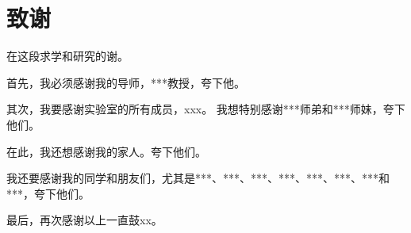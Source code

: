 
\makechaptertitlecenter\chapter{致\hspace{1em}谢}
在这段求学和研究的谢。
	
首先，我必须感谢我的导师，***教授，夸下他。

其次，我要感谢实验室的所有成员，xxx。
我想特别感谢***师弟和***师妹，夸下他们。

在此，我还想感谢我的家人。夸下他们。

我还要感谢我的同学和朋友们，尤其是***、***、***、***、***、***、***和***，夸下他们。

最后，再次感谢以上一直鼓xx。
	
	
	
